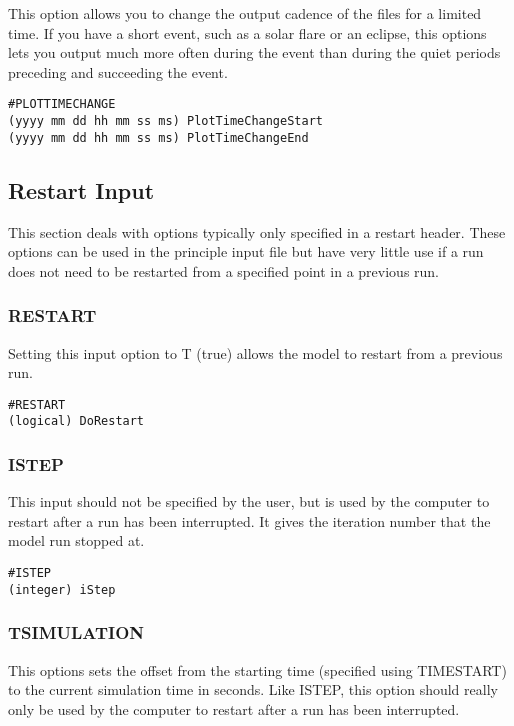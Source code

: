 This option allows you to change the output cadence of the files for a limited time.  If you have a short event, such as a solar flare or an eclipse, this options lets you output much more often during the event than during the quiet periods preceding and succeeding the event.

\begin{verbatim}
#PLOTTIMECHANGE
(yyyy mm dd hh mm ss ms) PlotTimeChangeStart
(yyyy mm dd hh mm ss ms) PlotTimeChangeEnd
\end{verbatim}



\subsection{Restart Input}

This section deals with options typically only specified in a restart header.  These options can be used in the principle input file but have very little use if a run does not need to be restarted from a specified point in a previous run.

\subsubsection{RESTART}

Setting this input option to T (true) allows the model to restart from a previous run.

\begin{verbatim}
#RESTART
(logical) DoRestart
\end{verbatim}

\subsubsection{ISTEP}
\label{istep.sec}

This input should not be specified by the user, but is used by the computer to restart after a run has been interrupted.  It gives the iteration number that the model run stopped at.

\begin{verbatim}
#ISTEP
(integer) iStep
\end{verbatim}

\subsubsection{TSIMULATION}

This options sets the offset from the starting time (specified using TIMESTART) to the current simulation time in seconds.  Like ISTEP, this option should really only be used by the computer to restart after a run has been interrupted.

